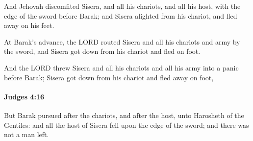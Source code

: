 			\begin{versebox}
					\item[BHS] 
					\item[ASV] And Jehovah discomfited Sisera, and all his chariots, and all his host, with the edge of the sword before Barak; and Sisera alighted from his chariot, and fled away on his feet.
					\item[NIV] At Barak’s advance, the LORD routed Sisera and all his chariots and army by the sword, and Sisera got down from his chariot and fled on foot.
					\item[NRSV] And the LORD threw Sisera and all his chariots and all his army into a panic before Barak; Sisera got down from his chariot and fled away on foot,
			\end{versebox}

		\paragraph{Judges 4:16} %
			\label{JUDGES-4-16}

			But Barak pursued after the chariots, and after the host, unto Harosheth of the Gentiles: and all the host of Sisera fell upon the edge of the sword; and there was not a man left.


